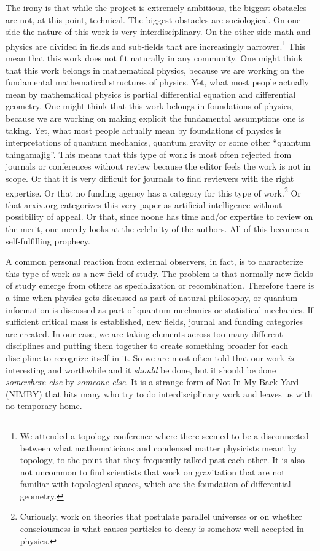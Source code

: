 \documentclass[letterpaper]{article}
\theoremstyle{plain}%
\theoremstyle{definition}
\theoremstyle{remark}
\numberwithin{equation}{section}
\begin{document}
The irony is that while the project is extremely ambitious, the biggest obstacles are not, at this point, technical. The biggest obstacles are sociological. On one side the nature of this work is very interdisciplinary. On the other side math and physics are divided in fields and sub-fields that are increasingly narrower.\footnote{We attended a topology conference where there seemed to be a disconnected between what mathematicians and condensed matter physicists meant by topology, to the point that they frequently talked past each other. It is also not uncommon to find scientists that work on gravitation that are not familiar with topological spaces, which are the foundation of differential geometry.} This mean that this work does not fit naturally in any community. One might think that this work belongs in mathematical physics, because we are working on the fundamental mathematical structures of physics. Yet, what most people actually mean by mathematical physics is partial differential equation and differential geometry. One might think that this work belongs in foundations of physics, because we are working on making explicit the fundamental assumptions one is taking. Yet, what most people actually mean by foundations of physics is interpretations of quantum mechanics, quantum gravity or some other ``quantum thingamajig''. This means that this type of work is most often rejected from journals or conferences without review because the editor feels the work is not in scope. Or that it is very difficult for journals to find reviewers with the right expertise. Or that no funding agency has a category for this type of work.\footnote{Curiously, work on theories that postulate parallel universes or on whether consciousness is what causes particles to decay is somehow well accepted in physics.} Or that arxiv.org categorizes this very paper as artificial intelligence without possibility of appeal. Or that, since noone has time and/or expertise to review on the merit, one merely looks at the celebrity of the authors. All of this becomes a self-fulfilling prophecy.

A common personal reaction from external observers, in fact, is to characterize this type of work as a new field of study. The problem is that normally new fields of study emerge from others as specialization or recombination. Therefore there is a time when physics gets discussed as part of natural philosophy, or quantum information is discussed as part of quantum mechanics or statistical mechanics. If sufficient critical mass is established, new fields, journal and funding categories are created. In our case, we are taking elements across too many different disciplines and putting them together to create something broader for each discipline to recognize itself in it. So we are most often told that our work \emph{is} interesting and worthwhile and it \emph{should} be done, but it should be done \emph{somewhere else} by \emph{someone else}. It is a strange form of Not In My Back Yard (NIMBY) that hits many who try to do interdisciplinary work and leaves us with no temporary home.
\end{document}
